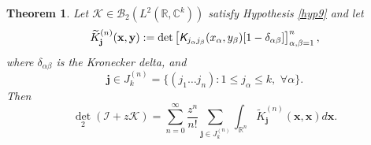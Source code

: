 \documentclass{birkjour}
\newtheorem{thm}{Theorem}[section]
\theoremstyle{definition}
\theoremstyle{remark}
\numberwithin{equation}{section}
\newcommand{\cB}{{\mathcal B}}
\begin{document}
\begin{thm}\label{finaldet2thm}
Let $\mathcal{K} \in \cB_2(L^2(\mathbb{R}, \mathbb{C}^{k}))$ satisfy Hypothesis \ref{hyp9} and let
\begin{equation}\label{Ktildejn}
    \widetilde{K}_{\mathbf{j}}^{(n)}(\mathbf{x},\mathbf{y}) := \det\left[ \emph{\textsf{K}}_{j_{\alpha} j_{\beta}}(x_{\alpha}, y_{\beta}) [1 - \delta_{\alpha \beta}] \right]_{\alpha, \beta = 1}^{n},
\end{equation}
where $\delta_{\alpha \beta}$ is the Kronecker delta, and 
\begin{equation}\label{jinJ}
    \mathbf{j} \in J_k^{(n)} = \{ (j_1 \dots j_n) : 1 \leq j_{\alpha} \leq k, \,\, \forall \alpha \}.
\end{equation}
Then \begin{equation}\label{det2RCk}
    {\det}_2(\mathcal{I} + z\mathcal{K}) = \sum_{n=0}^{\infty} \frac{z^n}{n!} \sum_{\mathbf{j} \in J_k^{(n)}} \int_{\mathbb{R}^n} \widetilde{K}_{\mathbf{j}}^{(n)}(\mathbf{x}, \mathbf{x}) d\mathbf{x}.
\end{equation}
\end{thm}
\end{document}
